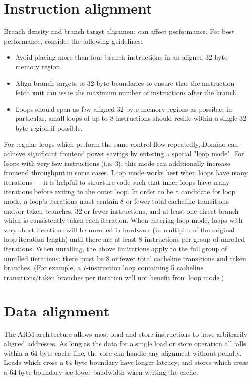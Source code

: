 \documentclass{article}
\begin{document}
\section{Instruction alignment}

Branch density and branch target alignment can affect performance. For
best performance, consider the following guidelines:
\begin{itemize}
\item Avoid placing more than four branch instructions in an aligned
  32-byte memory region.
\item Align branch targets to 32-byte boundaries to ensure that the
  instruction fetch unit can issue the maximum number of instructions
  after the branch.
\item Loops should span as few aligned 32-byte memory regions as
  possible; in particular, small loops of up to 8 instructions should
  reside within a single 32-byte region if possible.
\end{itemize}

For regular loops which perform the same control flow repeatedly,
Domino can achieve significant frontend power savings by entering a
special "loop mode". For loops with very few instructions (i.e. 3),
this mode can additionally increase frontend throughput in some
cases. Loop mode works best when loops have many iterations --- it is
helpful to structure code such that inner loops have many iterations
before exiting to the outer loop. In order to be a candidate for loop
mode, a loop's iterations must contain 8 or fewer total cacheline
transitions and/or taken branches, 32 or fewer instructions, and at
least one direct branch which is consistently taken each
iteration. When entering loop mode, loops with very short iterations will be unrolled in hardware (in multiples of the original loop iteration length) until there are at least 8 instructions per group of unrolled iterations. When unrolling, the above limitations apply to the full group of unrolled iterations: there must be 8 or fewer total cacheline transitions and taken branches. (For example, a 7-instruction loop containing 5 cacheline transitions/taken branches per iteration will not benefit from loop mode.)

\section{Data alignment}

The ARM architecture allows most load and store instructions to have
arbitrarily aligned addresses. As long as the data for a single load
or store operation all falls within a 64-byte cache line, the core can
handle any alignment without penalty. Loads which cross a 64-byte
boundary have longer latency, and stores which cross a 64-byte
boundary see lower bandwidth when writing the cache. \\
\end{document}
